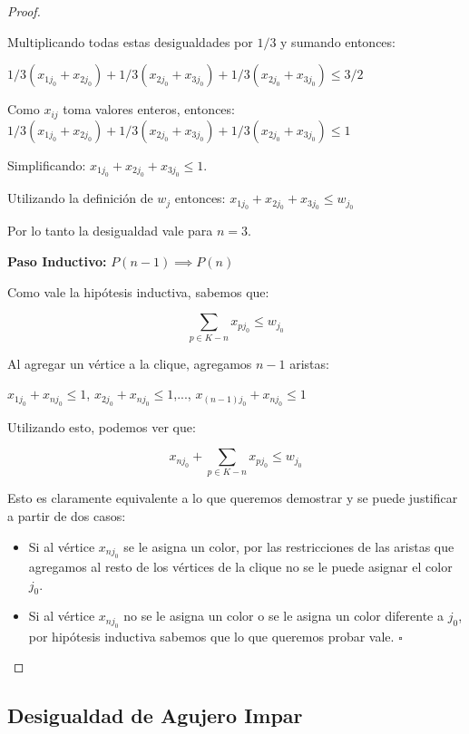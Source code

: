 \begin{proof}
\begin{enumerate}
Multiplicando todas estas desigualdades por $1/3$ y sumando entonces:

$1/3 (x_{1j_0} + x_{2j_0})  + 1/3 (x_{2j_0} + x_{3j_0}) + 1/3 (x_{2j_0} + x_{3j_0}) \leq 3/2$

Como $x_{ij}$ toma valores enteros, entonces:
$1/3 (x_{1j_0} + x_{2j_0})  + 1/3 (x_{2j_0} + x_{3j_0}) + 1/3 (x_{2j_0} + x_{3j_0}) \leq 1$

Simplificando: $x_{1j_0} + x_{2j_0} +  x_{3j_0} \leq 1$.

Utilizando la definición de $w_j$ entonces: $x_{1j_0} + x_{2j_0} +  x_{3j_0} \leq w_{j_0}$

Por lo tanto la desigualdad vale para $n=3$.

\end{enumerate}

\hfill

\textbf{Paso Inductivo:} $P(n-1) \implies P(n)$

Como vale la hipótesis inductiva, sabemos que:

\begin{equation*}
\sum_{p \in K-n} x_{pj_0} \leq w_{j_0}
\end{equation*}

Al agregar un vértice a la clique, agregamos $n-1$ aristas:

$x_{1j_0} + x_{nj_0} \leq 1$, $x_{2j_0} + x_{nj_0} \leq 1$,...,
$x_{(n-1)j_0} + x_{nj_0} \leq 1$

Utilizando esto, podemos ver que:

\begin{equation*}
x_{nj_0} + \sum_{p \in K-n} x_{pj_0} \leq w_{j_0}
\end{equation*}

Esto es claramente equivalente a lo que queremos demostrar y se puede justificar a partir de dos casos:

\begin{itemize}
\item Si al vértice $x_{nj_0}$ se le asigna un color, por las restricciones de las aristas que agregamos al resto de los vértices de la clique no se le puede asignar el color $j_0$.
\item Si al vértice $x_{nj_0}$ no se le asigna un color o se le asigna un color diferente a $j_0$, por hipótesis inductiva sabemos que lo que queremos probar vale. \hfill $\square$
\end{itemize}
\end{proof}

\subsection{Desigualdad de Agujero Impar}

